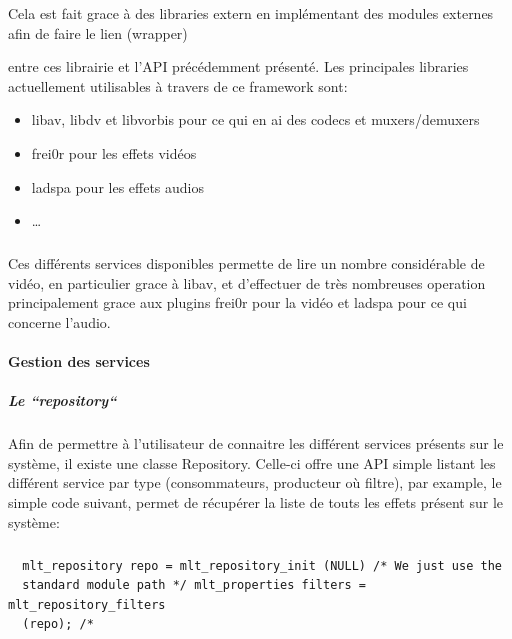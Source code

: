 Cela est fait grace à des libraries extern en implémentant des modules
externes afin de faire le lien (wrapper)


entre ces librairie et l'API précédemment présenté. Les
principales libraries actuellement utilisables à travers de ce framework
sont:

\begin{itemize}

  \item {libav, libdv et libvorbis pour ce qui en ai des codecs et
  muxers/demuxers}

  \item {frei0r pour les effets vidéos}

  \item {ladspa pour les effets audios}

  \item {\ldots}

\end{itemize}

\subparagraph{}

Ces différents services disponibles permette de lire un nombre
considérable de vidéo, en particulier grace à libav, et d'effectuer
de très nombreuses operation principalement grace aux plugins frei0r
pour la vidéo et ladspa pour ce qui concerne l'audio.

\paragraph{Gestion des services}

\subparagraph{Le ``repository``}

Afin de permettre à l'utilisateur de connaitre les différent services
présents sur le système, il existe une classe Repository. Celle-ci
offre une API simple listant les différent service par type
(consommateurs, producteur où filtre),  par example, le simple code
suivant, permet de récupérer la liste de touts les effets présent
sur le système:

\subparagraph{}

\begin{lstlisting}
  mlt_repository repo = mlt_repository_init (NULL) /* We just use the
  standard module path */ mlt_properties filters = mlt_repository_filters
  (repo); /*
\end{lstlisting}

